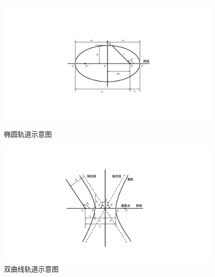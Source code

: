 \documentclass[10pt,a4]{article}
\numberwithin{equation}{section}
\begin{document}
\clearpage
\quad \\[-5em]
\begin{figure}[!htb]
	\begin{minipage}{0.55\linewidth}
		\centering
		\includegraphics[width=0.8\linewidth]{pic/椭圆.pdf}
		\vspace*{-0.5em}
		\caption{椭圆轨道示意图}
		\label{椭圆}
	\end{minipage}
	\begin{minipage}{0.45\linewidth}
		\centering
		\includegraphics[width=\linewidth]{pic/双曲线.pdf}
		\vspace*{-2em}
		\caption{双曲线轨道示意图}
		\label{双曲线}
	\end{minipage}
\end{figure}
\vspace*{-1em}
\end{document}
